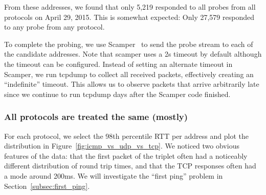 % 

From these addresses, we found that only 5,219 responded to
all probes from all protocols on April 29, 2015.  This is
somewhat expected: Only 27,579 responded to any probe from any
protocol.  

To complete the probing, we use
Scamper~\cite{luckie2010scamper} to send the probe stream
to each of the 
candidate addresses.
Note that
scamper uses a 2s timeout by default although the
timeout can be configured. Instead of setting an alternate
timeout in Scamper, we run tcpdump to collect all received
packets, effectively creating an ``indefinite'' timeout. This
allows us to observe packets that arrive arbitrarily late
since we continue to run tcpdump days after the Scamper 
code finished.

\subsubsection*{All protocols are treated the same (mostly)}

For each protocol, we select the 98th percentile RTT per address and
plot the distribution in Figure~\ref{fig:icmp_vs_udp_vs_tcp}. 
%
We noticed two obvious features of
the data: that the first packet of the triplet often had a
noticeably different distribution of round trip times, and
that the TCP responses often had a mode around 200ms.
%
We will investigate
the ``first ping'' problem in Section~\ref{subsec:first_ping}.

